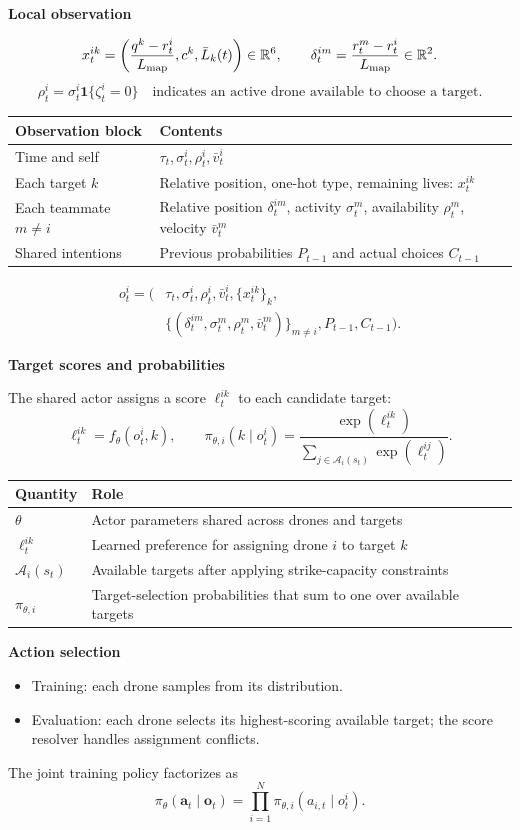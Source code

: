 \documentclass[11pt,a4paper]{article}
\newcommand{\ind}{\mathbf 1}
\newcommand{\R}{\mathbb R}
\newcommand{\lead}[1]{\medskip\textbf{#1}\par}
\begin{document}
\lead{Local observation}
\[
x_t^{ik}=\left(\frac{q^k-r_t^i}{L_{\rm map}},c^k,\bar L_k(t)\right)\in\R^6,
\qquad \delta_t^{im}=\frac{r_t^m-r_t^i}{L_{\rm map}}\in\R^2.
\]
\[
\rho_t^i=\sigma_t^i\ind\{\zeta_t^i=0\}
\quad\text{indicates an active drone available to choose a target.}
\]
\begin{center}
\begin{tabularx}{\linewidth}{@{}lX@{}}
\toprule
Observation block & Contents \\
\midrule
Time and self & $\tau_t,\sigma_t^i,\rho_t^i,\bar v_t^i$ \\
Each target $k$ & Relative position, one-hot type, remaining lives: $x_t^{ik}$ \\
Each teammate $m\ne i$ & Relative position $\delta_t^{im}$, activity $\sigma_t^m$, availability $\rho_t^m$, velocity $\bar v_t^m$ \\
Shared intentions & Previous probabilities $P_{t-1}$ and actual choices $C_{t-1}$ \\
\bottomrule
\end{tabularx}
\end{center}
\[
\begin{split}
o_t^i=\bigl(&\tau_t,\sigma_t^i,\rho_t^i,\bar v_t^i,\{x_t^{ik}\}_k,\\
&\{(\delta_t^{im},\sigma_t^m,\rho_t^m,\bar v_t^m)\}_{m\ne i},P_{t-1},C_{t-1}\bigr).
\end{split}
\]

\lead{Target scores and probabilities}
The shared actor assigns a score $\ell_t^{ik}$ to each candidate target:
\[
\ell_t^{ik}=f_\theta(o_t^i,k),\qquad
\pi_{\theta,i}(k\mid o_t^i)=
\frac{\exp(\ell_t^{ik})}{\sum_{j\in\mathcal A_i(s_t)}\exp(\ell_t^{ij})}.
\]
\begin{center}
\begin{tabularx}{\linewidth}{@{}lX@{}}
\toprule
Quantity & Role \\
\midrule
$\theta$ & Actor parameters shared across drones and targets \\
$\ell_t^{ik}$ & Learned preference for assigning drone $i$ to target $k$ \\
$\mathcal A_i(s_t)$ & Available targets after applying strike-capacity constraints \\
$\pi_{\theta,i}$ & Target-selection probabilities that sum to one over available targets \\
\bottomrule
\end{tabularx}
\end{center}

\lead{Action selection}
\begin{itemize}
\item Training: each drone samples from its distribution.
\item Evaluation: each drone selects its highest-scoring available target; the score resolver handles assignment conflicts.
\end{itemize}
The joint training policy factorizes as
\[
\pi_\theta(\boldsymbol a_t\mid\boldsymbol o_t)
=\prod_{i=1}^{N}\pi_{\theta,i}(a_{i,t}\mid o_t^i).
\]
\end{document}
